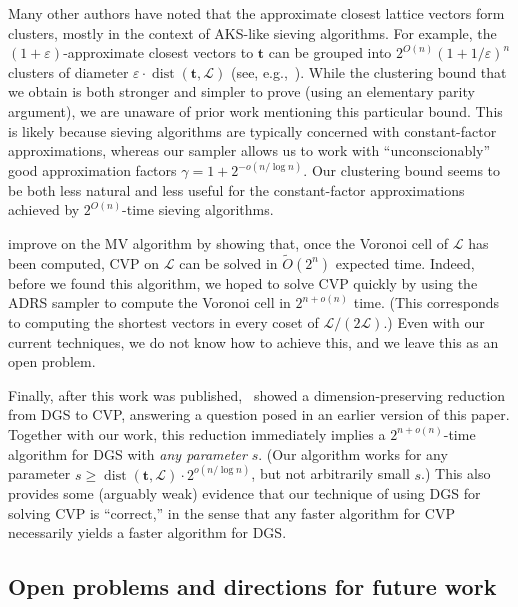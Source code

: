 \documentclass[11pt]{article}
\newcommand{\eps}{\varepsilon}
\renewcommand{\vec}[1]{\ensuremath{\mathbf{#1}}}
\newcommand{\problem}[1]{\mbox{#1}\xspace}
\newcommand{\scarequotes}[1]{``#1''}
\newcommand{\lat}{\mathcal{L}}
\DeclareMathOperator{\dist}{dist}
\begin{document}
Many other authors have noted that the approximate closest lattice vectors form clusters, mostly in the context of AKS-like sieving algorithms.
For example, the $(1+\eps)$-approximate closest vectors to $\vec{t}$ can be grouped
into $2^{O(n)}(1+1/\eps)^n$ clusters of diameter $\eps \cdot \dist(\vec{t}, \lat)$ (see, e.g.,~\cite{AJ08,DK13}). While the clustering bound that we
obtain is both stronger and simpler to prove (using an
elementary parity argument), we are unaware of prior work
mentioning this particular bound. This is likely because sieving algorithms
are typically concerned with constant-factor approximations, whereas our sampler allows us to work with
``unconscionably'' good
approximation factors $\gamma = 1+2^{-o(n/\log n)}$. Our clustering bound seems to be both less natural and less useful for the constant-factor approximations achieved by $2^{O(n)}$-time sieving algorithms.

\cite{BonifasD14} improve on the MV algorithm by showing that, once the Voronoi
cell of $\lat$ has been computed, \problem{CVP} on $\lat$ can be solved in
$\widetilde{O}(2^n)$ expected time. Indeed, before we found this algorithm, we 
hoped to solve \problem{CVP} quickly by using the ADRS sampler to compute the Voronoi cell in $2^{n+o(n)}$ time.
(This corresponds to computing
the shortest vectors in every coset of $\lat/(2\lat)$.) Even with our
current techniques, we do not know how to achieve this, and we leave this as an
open problem.

Finally, after this work was published,~\cite{DGStoSVP} showed a dimension-preserving reduction from DGS to CVP, answering a question posed in an earlier version of this paper. Together with our work, this reduction immediately implies a $2^{n+o(n)}$-time algorithm for DGS with \emph{any parameter} $s$. (Our algorithm works for any parameter $s \geq \dist(\vec{t}, \lat) \cdot 2^{o(n/\log n)}$, but not arbitrarily small $s$.) This also provides some (arguably weak) evidence that our technique of using DGS for solving CVP is \scarequotes{correct,} in the sense that any faster algorithm for CVP necessarily yields a faster algorithm for DGS. 


\subsection{Open problems and directions for future work}
\end{document}
